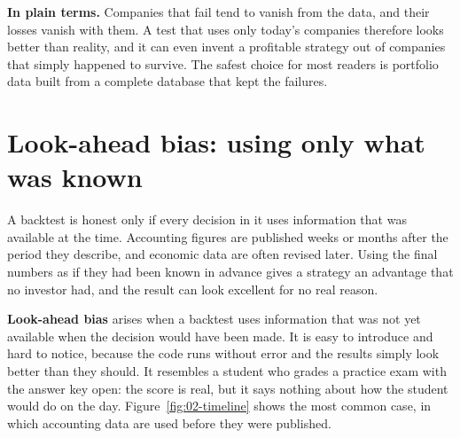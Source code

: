 \noindent\textbf{In plain terms.} Companies that fail tend to vanish from the data, and their losses vanish with them. A test that uses only today's companies therefore looks better than reality, and it can even invent a profitable strategy out of companies that simply happened to survive. The safest choice for most readers is portfolio data built from a complete database that kept the failures.


\section{Look-ahead bias: using only what was known}
\label{sec:02-lookahead}

A backtest is honest only if every decision in it uses information that was available at the time. Accounting figures are published weeks or months after the period they describe, and economic data are often revised later. Using the final numbers as if they had been known in advance gives a strategy an advantage that no investor had, and the result can look excellent for no real reason.

\textbf{Look-ahead bias} arises when a backtest uses information that was not yet available when the decision would have been made. It is easy to introduce and hard to notice, because the code runs without error and the results simply look better than they should. It resembles a student who grades a practice exam with the answer key open: the score is real, but it says nothing about how the student would do on the day. Figure~\ref{fig:02-timeline} shows the most common case, in which accounting data are used before they were published.



